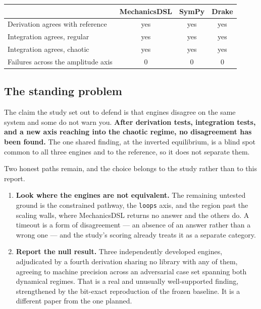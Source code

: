\documentclass[11pt,a4paper]{article}
\begin{document}
\begin{center}
\begin{tabular}{@{}lccc@{}}
\toprule
 & \textbf{MechanicsDSL} & \textbf{SymPy} & \textbf{Drake} \\
\midrule
Derivation agrees with reference & yes & yes & yes \\
Integration agrees, regular      & yes & yes & yes \\
Integration agrees, chaotic      & yes & yes & yes \\
Failures across the amplitude axis & 0 & 0 & 0 \\
\bottomrule
\end{tabular}
\end{center}

\subsection{The standing problem}

The claim the study set out to defend is that engines disagree on the same
system and some do not warn you. \textbf{After derivation tests, integration
tests, and a new axis reaching into the chaotic regime, no disagreement has been
found.} The one shared finding, at the inverted equilibrium, is a blind spot
common to all three engines and to the reference, so it does not separate them.

Two honest paths remain, and the choice belongs to the study rather than to
this report.

\begin{enumerate}[leftmargin=1.5em,itemsep=0.35em]
  \item \textbf{Look where the engines are not equivalent.} The remaining
        untested ground is the constrained pathway, the \texttt{loops} axis,
        and the region past the scaling walls, where MechanicsDSL returns no
        answer and the others do. A timeout is a form of disagreement --- an
        absence of an answer rather than a wrong one --- and the study's
        scoring already treats it as a separate category.
  \item \textbf{Report the null result.} Three independently developed engines,
        adjudicated by a fourth derivation sharing no library with any of them,
        agreeing to machine precision across an adversarial case set spanning
        both dynamical regimes. That is a real and unusually well-supported
        finding, strengthened by the bit-exact reproduction of the frozen
        baseline. It is a different paper from the one planned.
\end{enumerate}
\end{document}
